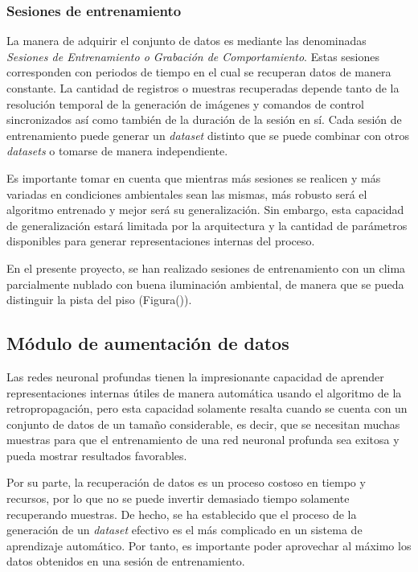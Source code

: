         \subsubsection{Sesiones de entrenamiento}
        La manera de adquirir el conjunto de datos es mediante las denominadas \textit{Sesiones de Entrenamiento o Grabación de Comportamiento}.
        Estas sesiones corresponden con periodos de tiempo en el cual se recuperan datos de manera constante. La cantidad de registros 
        o muestras recuperadas depende tanto de la resolución temporal de la generación de imágenes y comandos de control sincronizados 
        así como también de la duración de la sesión en sí. Cada sesión de entrenamiento puede generar un \textit{dataset} distinto 
        que se puede combinar con otros \textit{datasets} o tomarse de manera independiente. 

        Es importante tomar en cuenta que mientras más sesiones se realicen y más variadas en condiciones ambientales sean las mismas, 
        más robusto será el algoritmo entrenado y mejor será su generalización. Sin embargo, esta capacidad de generalización estará 
        limitada por la arquitectura y la cantidad de parámetros disponibles para generar representaciones internas del proceso. 

        En el presente proyecto, se han realizado sesiones de entrenamiento con un clima parcialmente nublado con buena iluminación 
        ambiental, de manera que se pueda distinguir la pista del piso (Figura()).


    \subsection{Módulo de aumentación de datos}
    Las redes neuronal profundas tienen la impresionante capacidad de aprender representaciones internas útiles de manera automática 
    usando el algoritmo de la retropropagación, pero esta capacidad solamente resalta cuando se cuenta con un conjunto de datos 
    de un tamaño considerable, es decir, que se necesitan muchas muestras para que el entrenamiento de una red neuronal profunda 
    sea exitosa y pueda mostrar resultados favorables. 
    
    Por su parte, la recuperación de datos es un proceso costoso en tiempo y recursos, por lo que no se puede invertir demasiado 
    tiempo solamente recuperando muestras. De hecho, se ha establecido que el proceso de la generación de un \textit{dataset} efectivo 
    es el más complicado en un sistema de aprendizaje automático. Por tanto, es importante poder aprovechar al máximo los datos 
    obtenidos en una sesión de entrenamiento.

